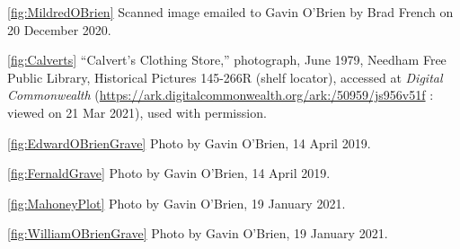 \ref{fig:MildredOBrien} Scanned image emailed to Gavin O'Brien by Brad French on 20 December 2020.

\ref{fig:Calverts} ``Calvert's Clothing Store,'' photograph, June 1979, Needham Free Public Library, Historical Pictures 145-266R (shelf locator), accessed at \textit{Digital Commonwealth} (\url{https://ark.digitalcommonwealth.org/ark:/50959/js956v51f} : viewed on 21 Mar 2021), used with permission.

\ref{fig:EdwardOBrienGrave} Photo by Gavin O'Brien, 14 April 2019.

\ref{fig:FernaldGrave} Photo by Gavin O'Brien, 14 April 2019.

\ref{fig:MahoneyPlot} Photo by Gavin O'Brien, 19 January 2021.

\ref{fig:WilliamOBrienGrave} Photo by Gavin O'Brien, 19 January 2021.